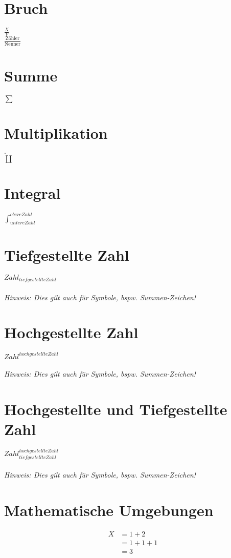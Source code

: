 \documentclass{scrarticle}
\begin{document}
	\Large
	\section{Bruch}
	$\frac{X}{Y}$ \\
	$\frac{\text{Zähler}}{\text{Nenner}}$
	\section{Summe}
	$\sum$
	\section{Multiplikation}
	$\cdot$ \\
	$\coprod$
	\section{Integral}
	$\int_{untere Zahl}^{obere Zahl}$
	\section{Tiefgestellte Zahl}
	$Zahl_{tiefgestellte Zahl}$
	\\\\\textit{Hinweis: Dies gilt auch für Symbole, bspw. Summen-Zeichen!}
	\section{Hochgestellte Zahl}
	$Zahl^{hochgestellte Zahl}$
	\\\\\textit{Hinweis: Dies gilt auch für Symbole, bspw. Summen-Zeichen!}
	\section{Hochgestellte und Tiefgestellte Zahl}
	$Zahl^{hochgestellte Zahl}_{tiefgestellte Zahl}$
	\\\\\textit{Hinweis: Dies gilt auch für Symbole, bspw. Summen-Zeichen!}
	
	\newpage
	
	\section{Mathematische Umgebungen}
	\begin{equation} \label{eq1}
		\begin{split}
			 X 	&= 1 + 2	\\
				&= 1 + 1 + 1 	\\
				&= 3
		\end{split}
	\end{equation}
\end{document}

